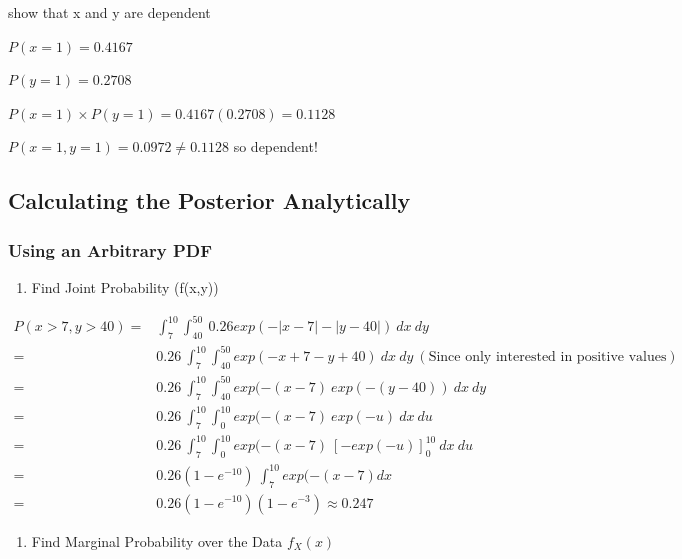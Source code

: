 \documentclass[11pt]{article}
\begin{document}
show that x and y are dependent

\(P(x = 1) = 0.4167\)

\(P(y = 1) = 0.2708\)

\(P(x = 1) \times P(y = 1) = 0.4167 (0.2708) = 0.1128\)

\(P(x = 1, y = 1) = 0.0972 \neq 0.1128\) so dependent!

\subsection{Calculating the Posterior Analytically}
\label{sec:org3974354}

\subsubsection{Using an Arbitrary PDF}
\label{sec:org085b91f}

\begin{enumerate}
\item Find Joint Probability (f(x,y))
\end{enumerate}

\begin{equation}
\begin{split}
P(x > 7, y > 40) = & \int_{7}^{10} \int_{40}^{50} \ 0.26 exp(- |x - 7| - |y - 40|) \ dx \ dy\\
    = & 0.26 \ \int_{7}^{10} \int_{40}^{50} exp(- x + 7 - y + 40) \ dx \ dy \label{eq:21a} \ (\text{Since only interested in positive values})\\
    = & 0.26 \ \int_{7}^{10} \int_{40}^{50} exp(- (x - 7) \ exp( - (y - 40)) \ dx \ dy\\
    = & 0.26 \ \int_{7}^{10} \int_{0}^{10} exp(- (x - 7) \ exp(-u) \ dx \ du\\
    = & 0.26 \ \int_{7}^{10} \int_{0}^{10} exp(- (x - 7) \ [- exp(-u)]_0^{10} \ dx \ du\\
    = & 0.26 (1 - e^{-10}) \ \int_{7}^{10} exp(- (x - 7) dx\\
    = & 0.26 (1 - e^{-10}) (1 - e^{-3}) \approx 0.247
\end{split}
\end{equation}

\begin{enumerate}
\item Find Marginal Probability over the Data \(f_X(x)\)
\end{enumerate}
\end{document}
